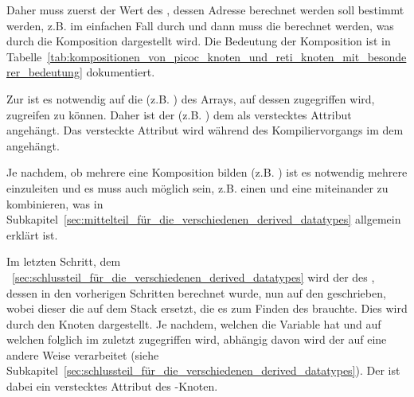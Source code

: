 Daher muss zuerst der Wert des , dessen Adresse berechnet werden soll bestimmt werden, z.B. im einfachen Fall durch  und dann muss die  berechnet werden, was durch die Komposition  dargestellt wird. Die Bedeutung der Komposition  ist in Tabelle~\ref{tab:kompositionen_von_picoc_knoten_und_reti_knoten_mit_besonderer_bedeutung} dokumentiert.

Zur  ist es notwendig auf die  (z.B. \smalltt{[Num('3')]}) des Arrays, auf dessen  zugegriffen wird, zugreifen zu können. Daher ist der  (z.B. ) dem   als \textcolor{gray!90!black}{verstecktes Attribut}  angehängt. Das \textcolor{gray!90!black}{versteckte Attribut} wird während des Kompiliervorgangs im  dem   angehängt.

Je nachdem, ob mehrere  eine Komposition bilden (z.B. ) ist es notwendig mehrere   einzuleiten und es muss auch möglich sein, z.B. einen   und eine   miteinander zu kombinieren, was in Subkapitel~\ref{sec:mittelteil_für_die_verschiedenen_derived_datatypes} allgemein erklärt ist.

Im letzten Schritt, dem ~\ref{sec:schlussteil_für_die_verschiedenen_derived_datatypes} wird der  des , dessen  in den vorherigen Schritten berechnet wurde, nun auf den  geschrieben, wobei dieser die  auf dem Stack ersetzt, die es zum Finden des  brauchte. Dies wird durch den Knoten  dargestellt. Je nachdem, welchen  die Variable  hat und auf welchen  folglich im  zuletzt zugegriffen wird, abhängig davon wird der   auf eine andere Weise verarbeitet (siehe Subkapitel~\ref{sec:schlussteil_für_die_verschiedenen_derived_datatypes}). Der  ist dabei ein \textcolor{gray!90!black}{verstecktes Attribut} des -Knoten.

